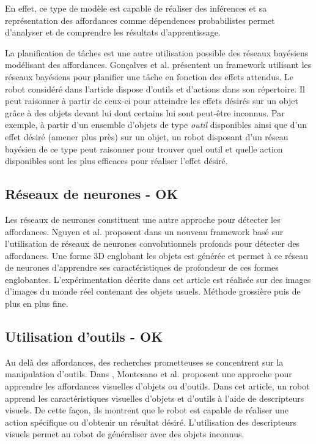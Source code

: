 \documentclass[draft]{llncs}
\begin{document}
En effet, ce type de modèle est capable de réaliser des inférences et sa représentation des affordances comme dépendences probabilistes permet d'analyser et de comprendre les résultats d'apprentissage.

La planification de tâches est une autre utilisation possible des réseaux bayésiens modélisant des affordances.
Gonçalves et al. présentent un framework utilisant les réseaux bayésiens \cite{Goncalves2014} pour planifier une tâche en fonction des effets attendus.
Le robot considéré dans l'article dispose d'outils et d'actions dans son répertoire.
Il peut raisonner à partir de ceux-ci pour atteindre les effets désirés sur un objet grâce à des objets devant lui dont certains lui sont peut-être inconnus.
Par exemple, à partir d'un ensemble d'objets de type \textit{outil} disponibles ainsi que d'un effet désiré (amener plus près) sur un objet, un robot disposant d'un réseau bayésien de ce type peut raisonner pour trouver quel outil et quelle action disponibles sont les plus efficaces pour réaliser l'effet désiré.




\subsection{Réseaux de neurones - OK}

Les réseaux de neurones constituent une autre approche pour détecter les affordances.
Nguyen et al. proposent dans \cite{Nguyen2017} un nouveau framework basé sur l'utilisation de réseaux de neurones convolutionnels profonds pour détecter des affordances.
Une forme 3D englobant les objets est générée et permet à ce réseau de neurones d'apprendre ses caractéristiques de profondeur de ces formes englobantes.
L'expérimentation décrite dans cet article est réalisée sur des images d'images du monde réel contenant des objets usuels.
Méthode grossière puis de plus en plus fine.



\subsection{Utilisation d'outils - OK}

Au delà des affordances, des recherches prometteuses se concentrent sur la manipulation d'outils.
Dans \cite{Montesano2008}, Montesano et al. proposent une approche pour apprendre les affordances visuelles d'objets ou d'outils.
Dans cet article, un robot apprend les caractéristiques visuelles d'objets et d'outils à l'aide de descripteurs visuels.
De cette façon, ils montrent que le robot est capable de réaliser une action spécifique ou d'obtenir un résultat désiré.
L'utilisation des descripteurs visuels permet au robot de généraliser avec des objets inconnus.
\end{document}
